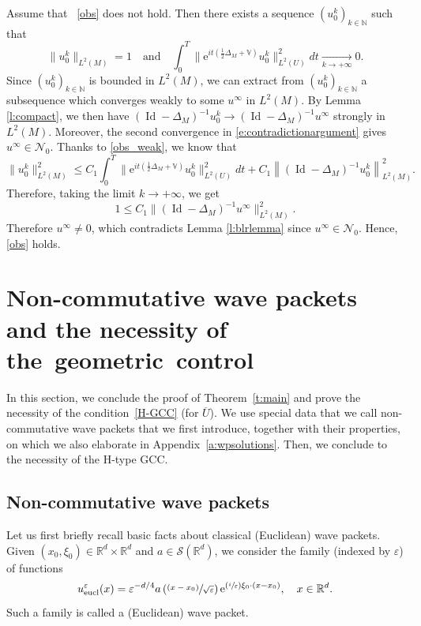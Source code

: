 \documentclass[JEP,XML,SOM,Unicode,published]{cedram}
\let\mathcal\mathscr
\newcommand{\Psfrac}[2]{(\sfrac{#1}{#2})}
\newcommand{\psfrac}[2]{\sfrac{(#1)}{#2}}
\newcommand{\eucl}{\mathrm{eucl}}
\newcommand{\rme}{\mathrm{e}}
\DeclareMathOperator{\Id}{Id}
\theoremstyle{plain}
\theoremstyle{definition}
\let\eps\varepsilon
\def\R{{\mathbb R}}
\def\N{{\mathbb N}}
\def\bbV{{\mathbb V}}
\newcommand{\Tend}[2]{\mathbin{\mathop{\longrightarrow}\limits_{#1\to#2}}}
\begin{document}
Assume that ~\eqref{obs} does not hold. Then there exists a sequence $(u_0^k)_{k\in\N}$ such that
\begin{equation} \label{e:contradictionargument}
\|u_0^k\|_{L^2(M)}=1\quad \mbox{and}\quad \int_0^T \bigl\| \rme^{it(\frac12 \Delta_M+\bbV)} u_0^k\bigr\|^2_{L^2(U)} dt
\Tend{k}{+\infty} 0.
\end{equation}
Since $(u_0^k)_{k\in\N}$ is bounded in $L^2(M)$, we can extract from $(u_0^k)_{k\in\N}$ a subsequence which converges weakly to some $u^\infty$ in $L^2(M)$. By Lemma \ref{l:compact}, we then have $(\Id-\Delta_M)^{-1}u_0^k\to (\Id-\Delta_M)^{-1}u^\infty$ strongly in $L^2(M)$. Moreover, the second convergence in \eqref{e:contradictionargument} gives $u^\infty\in\mathcal{N}_0$. Thanks to \eqref{obs_weak}, we know that
\begin{equation*}
\|u_0^k\|^2_{L^2(M)} \leq C_1 \int_0^T \bigl\| \rme^{it(\frac12 \Delta_M+\bbV)} u_0^k\bigr\|^2_{L^2(U)} dt
+ C_1 \left\| (\Id-\Delta_M)^{-1} u_0^k\right\|^2_{L^2(M)}.
\end{equation*}
Therefore, taking the limit $k\to +\infty$, we get
\begin{equation*}
1\leq C_1 \| (\Id-\Delta_M)^{-1} u^\infty\|^2_{L^2(M)}.
\end{equation*}
Therefore $u^\infty\neq 0$, which contradicts Lemma \ref{l:blrlemma} since $u^\infty\in\mathcal N_0$. Hence, \eqref{obs} holds.

\section{Non-commutative wave packets and the necessity of the~geometric~control}\label{sec:WP}

In this section, we conclude the proof of Theorem~\ref{t:main} and prove the necessity of the condition~\eqref{H-GCC} (for $\overline{U}$). We use special data that we call non-commutative wave packets that we first introduce, together with their properties, on which we also elaborate in Appendix~\ref{a:wpsolutions}. Then, we conclude to the necessity of the H-type GCC.

\subsection{Non-commutative wave packets} \label{s:WPnoncom}
Let us first briefly recall basic facts about classical (Euclidean) wave packets. Given $(x_0,\xi_0)\in\R^d\times\R^d$ and $a\in\mathcal S(\R^d)$, we consider the family (indexed by $\eps$) of functions
\begin{equation*}%
u_\eucl^\eps(x)= \eps^{-d/4} a\left(\psfrac{x-x_0}{\sqrt\eps}\right) \rme^{\Psfrac i\eps \xi_0\cdot(x-x_0)}, \quad x\in\R^d.
\end{equation*}
Such a family is called a (Euclidean) wave packet.
\end{document}
